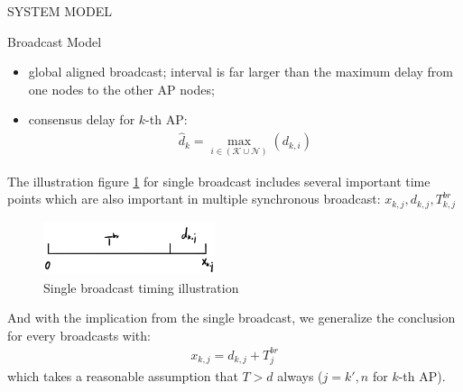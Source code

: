 \documentclass[10pt, conference, letterpaper]{IEEEtran}
\begin{document}
\begin{section}{SYSTEM MODEL}
        \begin{subsection}{Broadcast Model}
            \begin{itemize}
                \item global aligned broadcast; interval is far larger than the maximum delay from one nodes to the other AP nodes;
                \item consensus delay for $k$-th AP:
                    \begin{align}
                        \hat{d}_k = \max_{i\in(\mathcal{K} \cup \mathcal{N})}(d_{k,i})
                    \end{align}
            \end{itemize}

            The illustration figure \ref{fig:brd} for single broadcast includes several important time points which are also important in multiple synchronous broadcast: $x_{k,j}, d_{k,j}, T^{br}_{k,j}$
            \begin{figure}[ht]
                \centering
                \includegraphics[width=0.45\textwidth]{single-broadcast.png}
                \caption{Single broadcast timing illustration}
                \label{fig:brd}
            \end{figure}
            And with the implication from the single broadcast, we generalize the conclusion for every broadcasts with:
            \begin{align}
                x_{k,j} = d_{k,j} + T^{br}_{j}
            \end{align}
            which takes a reasonable assumption that $T>d$ always ($j=k',n$ for $k$-th AP).
        \end{subsection}
    \end{section}
\end{document}
